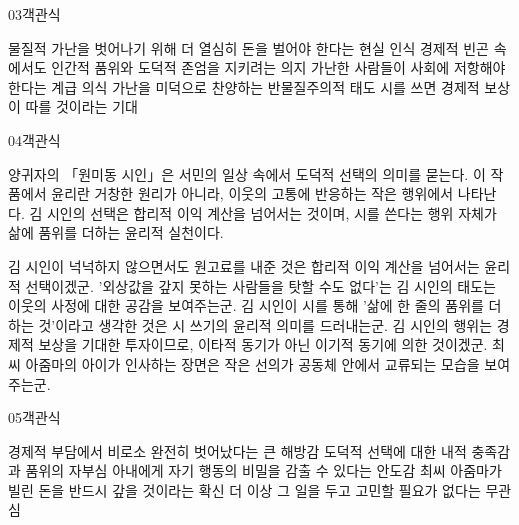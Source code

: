 \documentclass[fs85,seriesWit]{korfarm-base}
\begin{document}
\begin{kfQBlock}{03}{객관식}
\begin{kfChoices}
\kfChoice 물질적 가난을 벗어나기 위해 더 열심히 돈을 벌어야 한다는 현실 인식
\kfChoice 경제적 빈곤 속에서도 인간적 품위와 도덕적 존엄을 지키려는 의지
\kfChoice 가난한 사람들이 사회에 저항해야 한다는 계급 의식
\kfChoice 가난을 미덕으로 찬양하는 반물질주의적 태도
\kfChoice 시를 쓰면 경제적 보상이 따를 것이라는 기대
\end{kfChoices}
\end{kfQBlock}

\begin{kfQBlock}{04}{객관식}
\begin{kfEvidence}양귀자의 「원미동 시인」은 서민의 일상 속에서 도덕적 선택의 의미를 묻는다. 이 작품에서 윤리란 거창한 원리가 아니라, 이웃의 고통에 반응하는 작은 행위에서 나타난다. 김 시인의 선택은 합리적 이익 계산을 넘어서는 것이며, 시를 쓴다는 행위 자체가 삶에 품위를 더하는 윤리적 실천이다.\end{kfEvidence}
\begin{kfChoices}
\kfChoice 김 시인이 넉넉하지 않으면서도 원고료를 내준 것은 합리적 이익 계산을 넘어서는 윤리적 선택이겠군.
\kfChoice '외상값을 갚지 못하는 사람들을 탓할 수도 없다'는 김 시인의 태도는 이웃의 사정에 대한 공감을 보여주는군.
\kfChoice 김 시인이 시를 통해 '삶에 한 줄의 품위를 더하는 것'이라고 생각한 것은 시 쓰기의 윤리적 의미를 드러내는군.
\kfChoice 김 시인의 행위는 경제적 보상을 기대한 투자이므로, 이타적 동기가 아닌 이기적 동기에 의한 것이겠군.
\kfChoice 최씨 아줌마의 아이가 인사하는 장면은 작은 선의가 공동체 안에서 교류되는 모습을 보여주는군.
\end{kfChoices}
\end{kfQBlock}

\begin{kfQBlock}{05}{객관식}
\begin{kfChoices}
\kfChoice 경제적 부담에서 비로소 완전히 벗어났다는 큰 해방감
\kfChoice 도덕적 선택에 대한 내적 충족감과 품위의 자부심
\kfChoice 아내에게 자기 행동의 비밀을 감출 수 있다는 안도감
\kfChoice 최씨 아줌마가 빌린 돈을 반드시 갚을 것이라는 확신
\kfChoice 더 이상 그 일을 두고 고민할 필요가 없다는 무관심
\end{kfChoices}
\end{kfQBlock}
\end{document}
